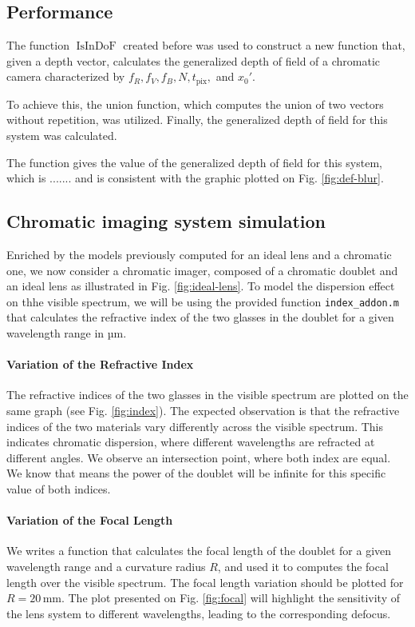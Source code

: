 \documentclass[10pt,letterpaper]{article}
\begin{document}
\subsection*{Performance}
The function $\operatorname{IsInDoF}$ created before was used to construct a new function that, given a depth vector, calculates the generalized depth of field of a chromatic camera characterized by $f_R, f_V, f_B, N, t_{\text{pix}},$ and $x_0'$. 

To achieve this, the union function, which computes the union of two vectors without repetition, was utilized. Finally, the generalized depth of field for this system was calculated.

The function gives the value of the generalized depth of field for this system, which is ....... and is  consistent with the graphic plotted on Fig. \ref{fig:def-blur}.


\subsection*{Chromatic imaging system simulation}
Enriched by the models previously computed for an ideal lens and a chromatic one, we now consider a chromatic imager, composed of a chromatic doublet and an ideal lens as illustrated in Fig. \ref{fig:ideal-lens}. To model the dispersion effect on thhe visible spectrum, we will be using the provided function \texttt{index\_addon.m} that calculates the refractive index of the two glasses in the doublet for a given wavelength range in µm.

\paragraph{Variation of the Refractive Index\\}
The refractive indices of the two glasses in the visible spectrum are plotted on the same graph (see Fig. \ref{fig:index}). The expected observation is that the refractive indices of the two materials vary differently across the visible spectrum. This indicates chromatic dispersion, where different wavelengths are refracted at different angles. We observe an intersection point, where both index are equal. We know that means the power of the doublet will be infinite for this specific value of both indices.


\paragraph{Variation of the Focal Length\\}
We writes a function that calculates the focal length of the doublet for a given wavelength range and a curvature radius \(R\), and used it to computes the focal length over the visible spectrum. The focal length variation should be plotted for \(R = 20 \, \text{mm}\). The plot presented on Fig. \ref{fig:focal} will highlight the sensitivity of the lens system to different wavelengths, leading to the corresponding defocus.
\end{document}
